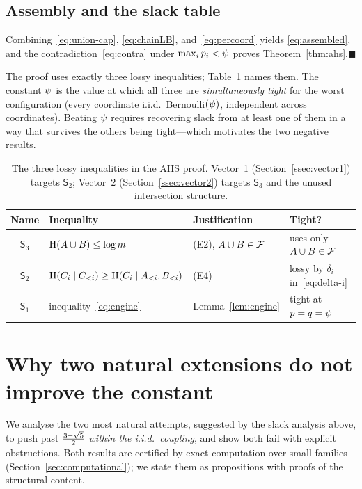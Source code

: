 \documentclass[11pt]{amsart}
\theoremstyle{definition}
\theoremstyle{remark}
\begin{document}
\subsection{Assembly and the slack table}\label{ssec:assembly}
Combining~\eqref{eq:union-cap}, \eqref{eq:chainLB}, and~\eqref{eq:percoord} yields
\eqref{eq:assembled}, and the contradiction~\eqref{eq:contra} under
$\max_i p_i<\psi$ proves Theorem~\ref{thm:ahs}.\qquad$\blacksquare$

The proof uses exactly three lossy inequalities; Table~\ref{tab:slack} names them.
The constant $\psi$ is the value at which all three are \emph{simultaneously
tight} for the worst configuration (every coordinate i.i.d.\ Bernoulli$(\psi)$,
independent across coordinates). Beating $\psi$ requires recovering slack from at
least one of them in a way that survives the others being tight---which motivates
the two negative results.

\begin{table}[t]
\centering
\small
\begin{tabular}{@{}clll@{}}
\toprule
Name & Inequality & Justification & Tight? \\
\midrule
$\mathsf S_3$ & $\operatorname{H}(A\cup B)\le\log m$ & (E2), $A\cup B\in\mathcal{F}$ & uses only $A\cup B\in\mathcal{F}$ \\
$\mathsf S_2$ & $\operatorname{H}(C_i\mid C_{<i})\ge\operatorname{H}(C_i\mid A_{<i},B_{<i})$ & (E4) & lossy by $\delta_i$ in~\eqref{eq:delta-i} \\
$\mathsf S_1$ & inequality~\eqref{eq:engine} & Lemma~\ref{lem:engine} & tight at $p=q=\psi$ \\
\bottomrule
\end{tabular}
\caption{The three lossy inequalities in the AHS proof. Vector~1
(Section~\ref{ssec:vector1}) targets $\mathsf S_2$; Vector~2
(Section~\ref{ssec:vector2}) targets $\mathsf S_3$ and the unused intersection
structure.}
\label{tab:slack}
\end{table}

\section{Why two natural extensions do not improve the constant}
\label{sec:negatives}

We analyse the two most natural attempts, suggested by the slack analysis above,
to push past $\tfrac{3-\sqrt{5}}{2}$ \emph{within the i.i.d.\ coupling}, and show both fail with
explicit obstructions. Both results are certified by exact computation over small
families (Section~\ref{sec:computational}); we state them as propositions with
proofs of the structural content.
\end{document}
